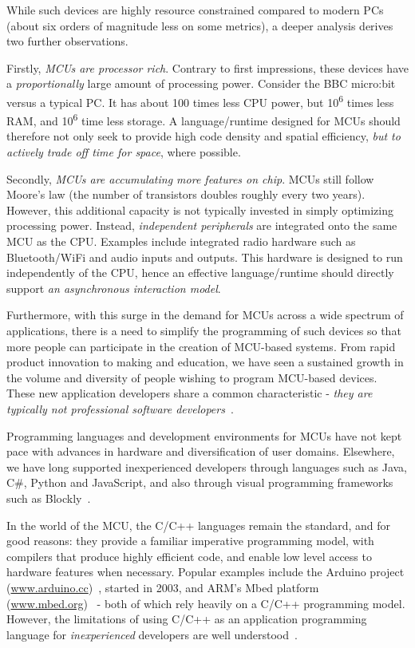 While such devices are highly resource constrained compared to modern PCs
(about six orders of magnitude less on some metrics), a deeper analysis derives two further observations.

Firstly, \emph{MCUs are processor rich}. Contrary to first impressions, these devices have
a \emph{proportionally} large amount of processing power. Consider the BBC micro:bit
versus a typical PC. It has about 100 times less CPU power, but 10\textsuperscript{6} times less RAM,
and 10\textsuperscript{6} time less storage. A language/runtime designed for MCUs should therefore not
only seek to provide high code density and spatial efficiency,
\emph{but to actively trade off time for space}, where possible.

Secondly, \emph{MCUs are accumulating more features on chip}.
MCUs still follow Moore's law (the number of transistors doubles roughly every two years).
However, this additional capacity is
not typically invested in simply optimizing processing power. Instead, \emph{independent peripherals}
are integrated onto the same MCU as the CPU. Examples include integrated radio hardware such
as Bluetooth/WiFi and audio inputs and outputs. This hardware is designed to run independently of the
CPU, hence an effective language/runtime should directly support \emph{an asynchronous
interaction model}.

Furthermore, with this surge in the demand for MCUs across a wide spectrum of applications,
there is a need to simplify the programming of such devices so that more people can participate in
the creation of MCU-based systems. From rapid product innovation to making and education,
we have seen a sustained growth in the volume and diversity of people wishing to program MCU-based devices. These new application developers share a common characteristic - \emph{they are typically not professional software developers}~\cite{dougherty2012maker,bruce2015make,maksimovic2014raspberry}.

Programming languages and development environments for MCUs have not kept pace with advances
in hardware and diversification of user domains. Elsewhere, we have long supported inexperienced developers through languages such as Java, C\#, Python and JavaScript, and also
through visual programming frameworks such as Blockly~\cite{Blocky2015}.

In the world of the MCU, the C/C++ languages remain the standard, and for good reasons:
they provide a familiar imperative programming model, with compilers that produce highly efficient code, and enable low level access to hardware features when necessary. Popular examples
include the Arduino project (\url{www.arduino.cc})~\cite{buildingArduino2014},
started in 2003, and ARM's Mbed platform (\url{www.mbed.org})~\cite{ARMmbed} - both of which rely heavily on a C/C++ programming model. However, the limitations of using C/C++ as an application programming language for
\emph{inexperienced} developers are well understood~\cite{blikstein2013gears}.

